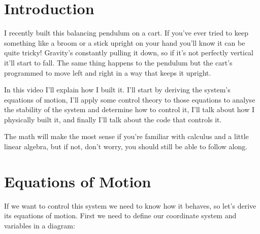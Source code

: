\documentclass{article}
\begin{document}
\tableofcontents

\section{Introduction}

I recently built this balancing pendulum on a cart. If you've ever tried to keep something like a broom or a stick upright on your hand you'll know it can be quite tricky! Gravity's constantly pulling it down, so if it’s not perfectly vertical it’ll start to fall. The same thing happens to the pendulum but the cart's programmed to move left and right in a way that keeps it upright.

In this video I’ll explain how I built it. I'll start by deriving the system's equations of motion, I'll apply some control theory to those equations to analyse the stability of the system and determine how to control it, I'll talk about how I physically built it, and finally I'll talk about the code that controls it.

The math will make the most sense if you're familiar with calculus and a little linear algebra, but if not, don't worry, you should still be able to follow along.

\section{Equations of Motion}

If we want to control this system we need to know how it behaves, so let’s derive its equations of motion. First we need to define our coordinate system and variables in a diagram:

\begin{figure}[H]
  \centering
\end{figure}
\end{document}
